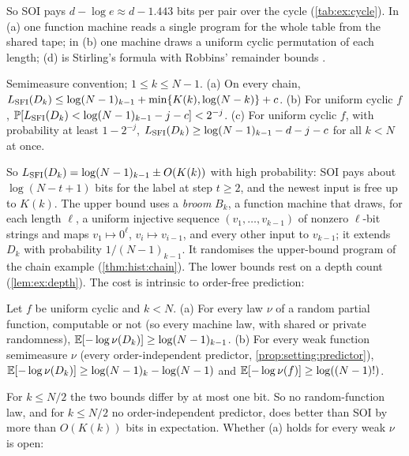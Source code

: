 So SOI pays $d-\log e\approx d-1.443$ bits per pair over the cycle (\cref{tab:ex:cycle}). In (a) one function machine reads a single program for the whole table from the shared tape; in (b) one machine draws a uniform cyclic permutation of each length; (d) is Stirling's formula with Robbins' remainder bounds \citep{robbins1955remark}.

\begin{theorem}[$k$ steps]\label{thm:ex:ksteps}
Semimeasure convention; $1\le k\le N-1$.
(a) On every chain, $L_{\mathrm{SFI}}(D_k)\le\log(N-1)_{k-1}+\min\{K(k),\log(N-k)\}+c$.
(b) For uniform cyclic $f$, $\mathbb{P}[L_{\mathrm{SFI}}(D_k)<\log(N-1)_{k-1}-j-c]<2^{-j}$.
(c) For uniform cyclic $f$, with probability at least $1-2^{-j}$, $L_{\mathrm{SFI}}(D_k)\ge\log(N-1)_{k-1}-d-j-c$ for all $k<N$ at once.
\end{theorem}

So $L_{\mathrm{SFI}}(D_k)=\log(N-1)_{k-1}\pm O(K(k))$ with high probability: SOI pays about $\log(N-t+1)$ bits for the label at step $t\ge2$, and the newest input is free up to $K(k)$. The upper bound uses a \emph{broom} $B_k$, a function machine that draws, for each length $\ell$, a uniform injective sequence $(v_1,\dots,v_{k-1})$ of nonzero $\ell$-bit strings and maps $v_1\mapsto0^\ell$, $v_i\mapsto v_{i-1}$, and every other input to $v_{k-1}$; it extends $D_k$ with probability $1/(N-1)_{k-1}$. It randomises the upper-bound program of the chain example (\cref{thm:hist:chain}). The lower bounds rest on a depth count (\cref{lem:ex:depth}). The cost is intrinsic to order-free prediction:

\begin{proposition}\label{prop:ex:orderfree}
Let $f$ be uniform cyclic and $k<N$.
(a) For every law $\nu$ of a random partial function, computable or not (so every machine law, with shared or private randomness), $\mathbb{E}[-\log\nu(D_k)]\ge\log(N-1)_{k-1}$.
(b) For every weak function semimeasure $\nu$ (every order-independent predictor, \cref{prop:setting:predictor}), $\mathbb{E}[-\log\nu(D_k)]\ge\log(N-1)_k-\log(N-1)$ and $\mathbb{E}[-\log\nu(f)]\ge\log((N-1)!)$.
\end{proposition}

For $k\le N/2$ the two bounds differ by at most one bit. So no random-function law, and for $k\le N/2$ no order-independent predictor, does better than SOI by more than $O(K(k))$ bits in expectation. Whether (a) holds for every weak $\nu$ is open:

